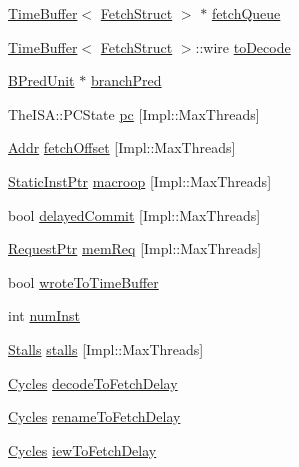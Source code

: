 \begin{DoxyCompactItemize}
\item 
\hyperlink{classTimeBuffer}{TimeBuffer}$<$ \hyperlink{classDefaultFetch_a3aac8607069f16898ef53cfaa2d97aeb}{FetchStruct} $>$ $\ast$ \hyperlink{classDefaultFetch_a9a2f350be647ebfb6567172812db491a}{fetchQueue}
\item 
\hyperlink{classTimeBuffer}{TimeBuffer}$<$ \hyperlink{classDefaultFetch_a3aac8607069f16898ef53cfaa2d97aeb}{FetchStruct} $>$::wire \hyperlink{classDefaultFetch_a5283adcc786817de9adc5a4601aa3a6f}{toDecode}
\item 
\hyperlink{classBPredUnit}{BPredUnit} $\ast$ \hyperlink{classDefaultFetch_adee29d0de843b42df1f1caf92d388413}{branchPred}
\item 
TheISA::PCState \hyperlink{classDefaultFetch_a6e6091c9272a281b8693c0f46279cad0}{pc} \mbox{[}Impl::MaxThreads\mbox{]}
\item 
\hyperlink{base_2types_8hh_af1bb03d6a4ee096394a6749f0a169232}{Addr} \hyperlink{classDefaultFetch_afc52fdca94918eaaf908094a80ab63ce}{fetchOffset} \mbox{[}Impl::MaxThreads\mbox{]}
\item 
\hyperlink{classRefCountingPtr}{StaticInstPtr} \hyperlink{classDefaultFetch_a1f84ef3ef8e6b11f3bb9a3a0a6224345}{macroop} \mbox{[}Impl::MaxThreads\mbox{]}
\item 
bool \hyperlink{classDefaultFetch_af247386188fbfaba3ea218eff3a771db}{delayedCommit} \mbox{[}Impl::MaxThreads\mbox{]}
\item 
\hyperlink{classRequest}{RequestPtr} \hyperlink{classDefaultFetch_a7b85bc06912a7000a9b27cab60626a7a}{memReq} \mbox{[}Impl::MaxThreads\mbox{]}
\item 
bool \hyperlink{classDefaultFetch_a2c7e870d4babdac0dc91fc7ffabd0f3d}{wroteToTimeBuffer}
\item 
int \hyperlink{classDefaultFetch_a07c4afd8e6b9ff4bdf20b573a39d1372}{numInst}
\item 
\hyperlink{structDefaultFetch_1_1Stalls}{Stalls} \hyperlink{classDefaultFetch_ade48cf321f5741ea8e54e071680cacdc}{stalls} \mbox{[}Impl::MaxThreads\mbox{]}
\item 
\hyperlink{classCycles}{Cycles} \hyperlink{classDefaultFetch_a2ef45e1e2bd510cfb43c0a03a6ab3f1c}{decodeToFetchDelay}
\item 
\hyperlink{classCycles}{Cycles} \hyperlink{classDefaultFetch_ae97f1fdea38bf1719a7d45a15f3dcd5c}{renameToFetchDelay}
\item 
\hyperlink{classCycles}{Cycles} \hyperlink{classDefaultFetch_a986e734c1e66dc0be1723ade04d06d4b}{iewToFetchDelay}
\item 

\end{DoxyCompactItemize}
